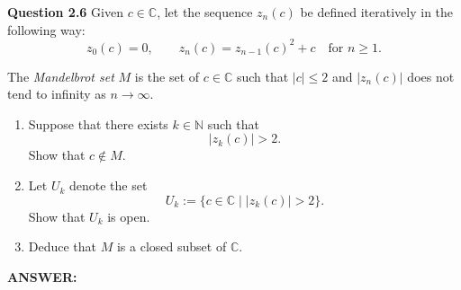 \documentclass[12pt,a4paper]{article}
\newcommand{\question}[2]{\textbf{Question #1}\quad #2}
\begin{document}
\question{2.6}{
Given $c \in \mathbb{C}$, let the sequence $z_n(c)$ be defined iteratively in the following way:
\[
z_0(c)=0,
\qquad
z_n(c)=z_{n-1}(c)^2+c
\quad \text{for } n\geq 1.
\]

The \textit{Mandelbrot set} $M$ is the set of $c\in\mathbb{C}$ such that $|c|\leq 2$ and $|z_n(c)|$ does not tend to infinity as $n\to\infty$.

\begin{enumerate}[label=(\roman*)]
    \item Suppose that there exists $k\in\mathbb{N}$ such that
    \[
    |z_k(c)|>2.
    \]
    Show that $c\notin M$.

    \item Let $U_k$ denote the set
    \[
    U_k:=\{c\in\mathbb{C}\mid |z_k(c)|>2\}.
    \]
    Show that $U_k$ is open.

    \item Deduce that $M$ is a closed subset of $\mathbb{C}$.
\end{enumerate}
}

\vspace{1cm}

\textbf{ANSWER:}
\end{document}
